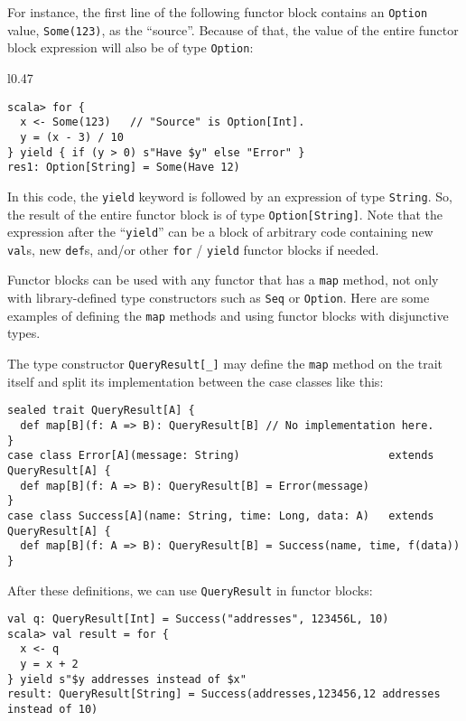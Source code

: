 For instance, the first line of the following functor block contains
an \lstinline!Option! value, \lstinline!Some(123)!, as the \textsf{``}source\textsf{''}.
Because of that, the value of the entire functor block expression
will also be of type \lstinline!Option!:

\begin{wrapfigure}{l}{0.47\columnwidth}%
\vspace{-0.85\baselineskip}
\begin{lstlisting}
scala> for {
  x <- Some(123)   // "Source" is Option[Int].
  y = (x - 3) / 10
} yield { if (y > 0) s"Have $y" else "Error" }
res1: Option[String] = Some(Have 12)
\end{lstlisting}

\vspace{-1.2\baselineskip}
\end{wrapfigure}%

\noindent In this code, the \lstinline!yield! keyword is followed
by an expression of type \lstinline!String!. So, the result of the
entire functor block is of type \lstinline!Option[String]!. Note
that the expression after the \textsf{``}\lstinline!yield!\textsf{''} can be a block
of arbitrary code containing new \lstinline!val!s, new \lstinline!def!s,
and/or other \lstinline!for! / \lstinline!yield! functor blocks
if needed.

Functor blocks can be used with any functor that has a \lstinline!map!
method, not only with library-defined type constructors such as \lstinline!Seq!
or \lstinline!Option!. Here are some examples of defining the \lstinline!map!
methods and using functor blocks with disjunctive types.

The type constructor \lstinline!QueryResult[_]! may define the \lstinline!map!
method on the trait itself and split its implementation between the
case classes like this:
\begin{lstlisting}
sealed trait QueryResult[A] {
  def map[B](f: A => B): QueryResult[B] // No implementation here.
}
case class Error[A](message: String)                       extends QueryResult[A] {
  def map[B](f: A => B): QueryResult[B] = Error(message)
}
case class Success[A](name: String, time: Long, data: A)   extends QueryResult[A] {
  def map[B](f: A => B): QueryResult[B] = Success(name, time, f(data))
}
\end{lstlisting}
After these definitions, we can use \lstinline!QueryResult! in functor
blocks:
\begin{lstlisting}
val q: QueryResult[Int] = Success("addresses", 123456L, 10)
scala> val result = for {
  x <- q
  y = x + 2
} yield s"$y addresses instead of $x"
result: QueryResult[String] = Success(addresses,123456,12 addresses instead of 10)
\end{lstlisting}

